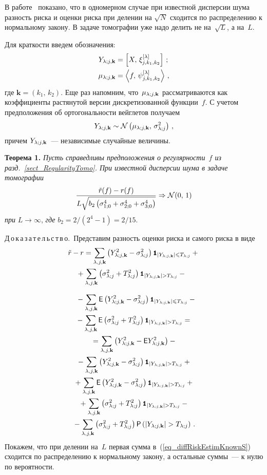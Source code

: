 \begin{multicols}{2}
В работе~\cite{MarkinLimitDistr} показано, что в одномерном случае при известной дисперсии шума 
разность риска и оценки риска при делении на $\sqrt{N}$ сходится по распределению к нормальному 
закону. В задаче томографии уже надо делить не на~$\sqrt{L}$, а на~$L$.

Для краткости введем обозначения:
\begin{align*}
Y_{\lambda;j,\mathbf{k}} &= \left[X,\,\xi^{[\lambda]}_{j,k_1,k_2}\right]\,;\\
\mu_{\lambda;j,\mathbf{k}} &= \left\langle f,\,\psi^{[\lambda]}_{j,k_1,k_2}\right\rangle\,,
\end{align*}
где $\mathbf{k}=\left(k_1,\,k_2\right)$. Еще раз напомним, что~$\mu_{\lambda;j,\mathbf{k}}$ рассматриваются 
как коэффициенты растянутой версии дискретизованной функции~$f$. С учетом предположения об 
ортогональности вейглетов получаем
\begin{equation}
\label{eq_YljkNormalDistributed}
Y_{\lambda;j,\mathbf{k}} \sim \mathcal{N}\left(\mu_{\lambda;j,\mathbf{k}},\,\sigma_{\lambda;j}^2\right)\,,
\end{equation}
причем $Y_{\lambda;j,\mathbf{k}}$~--- независимые случайные величины.

\medskip

\noindent
\textbf{Теорема 1.}
\textit{Пусть справедливы предположения о регулярности~$f$ из разд.~\ref{sect_RegularityTomo}. 
При известной дисперсии шума в задаче томографии}
\begin{equation*}
\displaystyle\frac{\displaystyle \tilde r(f)-r(f)\mathstrut}{\displaystyle L \sqrt{ b_2 \left( \sigma_{1;0}^4 + \sigma_{2;0}^4 + \sigma_{3;0}^4 \right) }\mathstrut} \Rightarrow \mathcal{N}(0,\,1)
\end{equation*}
\textit{при} $L\rightarrow\infty$, \textit{где} $b_2=2/(2^4-1)=2/15$.

\medskip

\noindent
Д\,о\,к\,а\,з\,а\,т\,е\,л\,ь\,с\,т\,в\,о.\ 
Представим разность оценки риска и самого риска в виде
\begin{multline*}
\tilde r-r=\sumljk\left(\Yljk^2-\slj\right)\indYjklTj +{}\\
\!\!\!\!{}+ \sumljk\left(\slj+\Tlj^2\right)\indYjkgTj - {}
\end{multline*}

\noindent
\begin{multline}
\ \ {}- \sumljk\e\left(\Yljk^2-\slj\right)\indYjklTj -{}\\
{}- \sumljk\e\left(\slj+\Tlj^2\right)\indYjkgTj ={}\\
{}= \sumljk\left(\Yljk^2-\e\Yljk^2\right) -{}\\
{}- \sumljk\left(\Yljk^2-\slj\right)\indYjkgTj + {}\\
{}+ \sumljk\e\left(\Yljk^2-\slj\right)\indYjkgTj +{}\\
{}+ \sumljk\left(\slj+\Tlj^2\right)\indYjkgTj -{}\\
{}- \sumljk\left(\slj+\Tlj^2\right)\prbYjkgTj\,.
\label{eq_diffRiskEstimKnownS}
\end{multline}
Покажем, что при делении на~$L$ первая сумма в~(\ref{eq_diffRiskEstimKnownS}) сходится по распределению
к нормальному закону, а остальные суммы~--- к нулю по вероятности.


\end{multicols}
